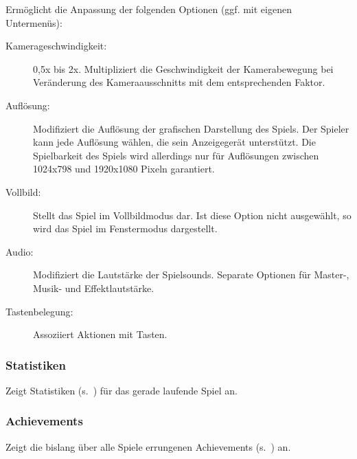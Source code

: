 Ermöglicht die Anpassung der folgenden Optionen (ggf. mit eigenen Untermenüs):

\begin{description}
  \item[Kamerageschwindigkeit:] 0,5x bis 2x. Multipliziert die Geschwindigkeit
    der Kamerabewegung bei Veränderung des Kameraausschnitts mit dem
    entsprechenden Faktor.
  \item[Auflösung:] Modifiziert die Auflösung der grafischen Darstellung des
    Spiels. Der Spieler kann jede Auflösung wählen, die sein Anzeigegerät
    unterstützt. Die Spielbarkeit des Spiels wird allerdings nur für
    Auflösungen zwischen 1024x798 und 1920x1080 Pixeln garantiert.
  \item[Vollbild:] Stellt das Spiel im Vollbildmodus dar. Ist diese Option
    nicht ausgewählt, so wird das Spiel im Fenstermodus dargestellt.
  \item[Audio:] Modifiziert die Lautstärke der Spielsounds. Separate Optionen
    für Master-, Musik- und Effektlautstärke.
  \item[Tastenbelegung:] Assoziiert Aktionen mit Tasten.
\end{description}

\subsubsection{Statistiken}
\label{menu:statistiken}

Zeigt Statistiken (s.~) für das gerade laufende Spiel
an.

\subsubsection{Achievements}
\label{menu:achievements}

Zeigt die bislang über alle Spiele errungenen Achievements
(s.~) an.
